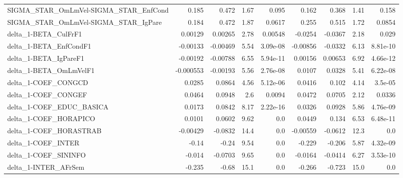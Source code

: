 \begin{tabular}{lrrrrrrrr}
SIGMA\_STAR\_OmLmVel-SIGMA\_STAR\_EnfCond &       0.185 &        0.472 &    1.67 &    0.095 &      0.162 &       0.368 &         1.41 &         0.158 \\
SIGMA\_STAR\_OmLmVel-SIGMA\_STAR\_IgPare  &       0.184 &        0.472 &    1.87 &   0.0617 &      0.255 &       0.515 &         1.72 &        0.0854 \\
delta\_1-BETA\_CulFrF1                  &     0.00129 &      0.00265 &    2.78 &  0.00548 &    -0.0254 &     -0.0367 &         2.18 &         0.029 \\
delta\_1-BETA\_EnfCondF1                &    -0.00133 &     -0.00469 &    5.54 & 3.09e-08 &   -0.00856 &     -0.0332 &         6.13 &      8.81e-10 \\
delta\_1-BETA\_IgPareF1                 &    -0.00192 &     -0.00788 &    6.55 & 5.94e-11 &    0.00156 &     0.00653 &         6.92 &      4.66e-12 \\
delta\_1-BETA\_OmLmVelF1                &   -0.000553 &     -0.00193 &    5.56 & 2.76e-08 &     0.0107 &      0.0328 &         5.41 &      6.22e-08 \\
delta\_1-COEF\_CONGCD                   &      0.0285 &       0.0864 &    4.56 & 5.12e-06 &     0.0416 &       0.102 &         4.14 &       3.5e-05 \\
delta\_1-COEF\_CONGEF                   &      0.0464 &       0.0948 &     2.6 &   0.0094 &     0.0472 &      0.0705 &         2.12 &        0.0336 \\
delta\_1-COEF\_EDUC\_BASICA              &      0.0173 &       0.0842 &    8.17 & 2.22e-16 &     0.0326 &      0.0928 &         5.86 &      4.76e-09 \\
delta\_1-COEF\_HORAPICO                 &      0.0101 &       0.0602 &    9.62 &      0.0 &     0.0449 &       0.134 &         6.53 &      6.48e-11 \\
delta\_1-COEF\_HORASTRAB                &    -0.00429 &      -0.0832 &    14.4 &      0.0 &   -0.00559 &     -0.0612 &         12.3 &           0.0 \\
delta\_1-COEF\_INTER                    &       -0.14 &        -0.24 &    9.54 &      0.0 &     -0.229 &      -0.206 &         5.87 &      4.32e-09 \\
delta\_1-COEF\_SININFO                  &      -0.014 &      -0.0703 &    9.65 &      0.0 &    -0.0164 &     -0.0414 &         6.27 &      3.53e-10 \\
delta\_1-INTER\_AFrSem                  &      -0.235 &        -0.68 &    15.1 &      0.0 &     -0.266 &      -0.723 &         15.0 &           0.0 \\

\end{tabular}
